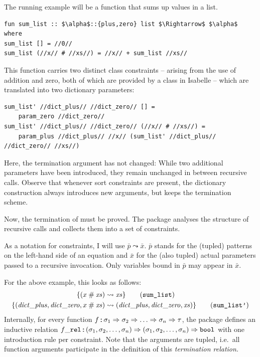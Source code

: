 The running example will be a function that sums up values in a list.
%
\begin{lstlisting}
fun sum_list :: $\alpha$::{plus,zero} list $\Rightarrow$ $\alpha$ where
sum_list [] = //0//
sum_list (//x// # //xs//) = //x// + sum_list //xs//
\end{lstlisting}
%
This function carries two distinct class constraints -- arising from the use of addition and zero, both of which are provided by a class in Isabelle -- which are translated into two dictionary parameters:
%
\begin{lstlisting}[language=Isabelle]
sum_list' //dict_plus// //dict_zero// [] =
    param_zero //dict_zero//
sum_list' //dict_plus// //dict_zero// (//x// # //xs//) =
    param_plus //dict_plus// //x// (sum_list' //dict_plus// //dict_zero// //xs//)
\end{lstlisting}
%
Here, the termination argument has not changed:
While two additional parameters have been introduced, they remain unchanged in between recursive calls.
Observe that whenever sort constraints are present, the dictionary construction always introduces new arguments, but keeps the termination scheme.

Now, the termination of  must be proved.
The  package analyses the structure of recursive calls and collects them into a set of constraints.

As a notation for constraints, I will use $\bar{p} \leadsto \bar{x}$.
$\bar{p}$ stands for the (tupled) patterns on the left-hand side of an equation and $\bar{x}$ for the (also tupled) actual parameters passed to a recursive invocation.
Only variables bound in $\bar{p}$ may appear in $\bar{x}$.


\noindent
For the above example, this looks as follows:
%
\begin{align}
  \{ (x \cons \mathit{xs}) &\leadsto \mathit{xs} \} \tag{\holconst{sum\_list}} \\
  \{ (\mathit{dict\_plus}, \mathit{dict\_zero}, x \cons \mathit{xs}) &\leadsto (\mathit{dict\_plus}, \mathit{dict\_zero}, \mathit{xs})\} \tag{\holconst{sum\_list'}}
\end{align}
%
Internally, for every function $f \mathbin{:\!\!:} \sigma_1 \Rightarrow \sigma_2 \Rightarrow \ldots \Rightarrow \sigma_n \Rightarrow \tau$, the package defines an inductive relation $f\_\texttt{\textup{rel}} \mathbin{:\!\!:} (\sigma_1, \sigma_2, \ldots, \sigma_n) \Rightarrow (\sigma_1, \sigma_2, \ldots, \sigma_n) \Rightarrow \texttt{\textup{bool}}$ with one introduction rule per constraint.
Note that the arguments are tupled, i.e.\ all function arguments participate in the definition of this \emph{termination relation.}

